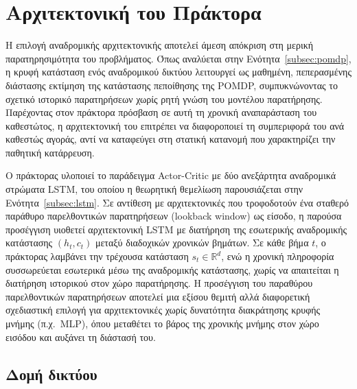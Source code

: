 

\section{Αρχιτεκτονική του Πράκτορα}
\label{sec:agent}

Η επιλογή αναδρομικής αρχιτεκτονικής αποτελεί άμεση απόκριση στη μερική
παρατηρησιμότητα του προβλήματος. Όπως αναλύεται στην Ενότητα~\ref{subsec:pomdp}, η κρυφή
κατάσταση ενός αναδρομικού δικτύου λειτουργεί ως μαθημένη, πεπερασμένης
διάστασης εκτίμηση της κατάστασης πεποίθησης της POMDP, συμπυκνώνοντας το
σχετικό ιστορικό παρατηρήσεων χωρίς ρητή γνώση του μοντέλου παρατήρησης.
Παρέχοντας στον πράκτορα πρόσβαση σε αυτή τη χρονική αναπαράσταση του
καθεστώτος, η αρχιτεκτονική του επιτρέπει να διαφοροποιεί τη συμπεριφορά του
ανά καθεστώς αγοράς, αντί να καταφεύγει στη στατική κατανομή που χαρακτηρίζει
την παθητική κατάρρευση.

Ο πράκτορας υλοποιεί το παράδειγμα Actor-Critic με δύο ανεξάρτητα αναδρομικά στρώματα 
LSTM, του οποίου η θεωρητική θεμελίωση παρουσιάζεται στην Ενότητα~\ref{subsec:lstm}. Σε
αντίθεση με αρχιτεκτονικές που τροφοδοτούν ένα σταθερό παράθυρο παρελθοντικών
παρατηρήσεων (lookback window) ως είσοδο, η παρούσα προσέγγιση υιοθετεί
αρχιτεκτονική LSTM με διατήρηση της εσωτερικής αναδρομικής κατάστασης
$(h_t, c_t)$ μεταξύ διαδοχικών χρονικών βημάτων. Σε κάθε βήμα $t$, ο πράκτορας
λαμβάνει την τρέχουσα κατάσταση $s_t \in \mathbb{R}^{d}$, ενώ η χρονική
πληροφορία συσσωρεύεται εσωτερικά μέσω της αναδρομικής κατάστασης, χωρίς να
απαιτείται η διατήρηση ιστορικού στον χώρο παρατήρησης. Η προσέγγιση του
παραθύρου παρελθοντικών παρατηρήσεων αποτελεί μια εξίσου θεμιτή αλλά
διαφορετική σχεδιαστική επιλογή για αρχιτεκτονικές χωρίς δυνατότητα
διακράτησης κρυφής μνήμης (π.χ.\ MLP), όπου μεταθέτει το βάρος της χρονικής
μνήμης στον χώρο εισόδου και αυξάνει τη διάστασή του.

\subsection{Δομή δικτύου}

